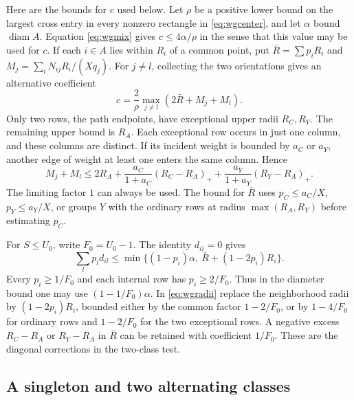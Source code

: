 \documentclass[11pt,a4paper]{article}
\theoremstyle{definition}
\begin{document}
Here are the bounds for $c$ used below. Let $\rho$ be a positive
lower bound on the largest cross entry in every nonzero rectangle in
\eqref{eq:wgcenter}, and let $\alpha$ bound $\operatorname{diam}A$.
Equation \eqref{eq:wgmix} gives $c\le4\alpha/\rho$ in the sense
that this value may be used for $c$. If each $i\in A$ lies within
$R_i$ of a common point, put $\bar R=\sum p_iR_i$ and
$M_j=\sum_i N_{ij}R_i/(Xq_j)$. For $j\ne l$, collecting the two
orientations gives an alternative coefficient
\begin{equation}
 c=\frac2\rho\max_{j\ne l}(2\bar R+M_j+M_l).
 \label{eq:wgradii}
\end{equation}
Only two rows, the path endpoints, have exceptional upper radii
$R_C,R_Y$. The remaining upper bound is $R_A$. Each exceptional row
occurs in just one column, and these columns are distinct. If its
incident weight is bounded by $a_C$ or $a_Y$, another edge of weight
at least one enters the same column. Hence
\[
 M_j+M_l\le 2R_A+
 \frac{a_C}{1+a_C}(R_C-R_A)_++
 \frac{a_Y}{1+a_Y}(R_Y-R_A)_+.
\]
The limiting factor $1$ can always be used. The bound for $\bar R$ uses
$p_C\le a_C/X$, $p_Y\le a_Y/X$, or groups $Y$ with the ordinary
rows at radius $\max(R_A,R_Y)$ before estimating $p_C$.

For $S\le U_0$, write $F_0=U_0-1$. The identity $d_{ii}=0$ gives
\[
 \sum_l p_l d_{il}\le
 \min\{(1-p_i)\alpha,\ \bar R+(1-2p_i)R_i\}.
\]
Every $p_i\ge1/F_0$ and each internal row has $p_i\ge2/F_0$.
Thus in the diameter bound one may use $(1-1/F_0)\alpha$. In
\eqref{eq:wgradii} replace the neighborhood radii by
$(1-2p_i)R_i$, bounded either by the common factor $1-2/F_0$, or by
$1-4/F_0$ for ordinary rows and $1-2/F_0$ for the two exceptional
rows. A negative excess $R_C-R_A$ or $R_Y-R_A$ in $\bar R$ can be
retained with coefficient $1/F_0$. These are the diagonal corrections
in the two-class test.

\subsection{A singleton and two alternating classes}
\end{document}
